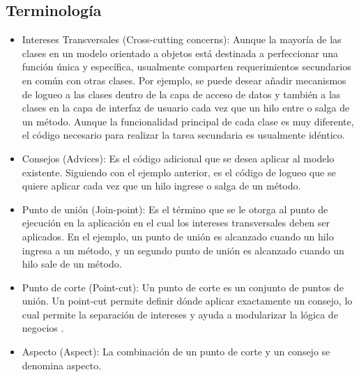 \subsection{Terminología}
\begin{itemize}
  \item Intereses Transversales (Cross-cutting concerns): Aunque la mayoría de
  las clases en un modelo orientado a objetos está destinada a perfeccionar una función única y
  específica, usualmente comparten requerimientos secundarios en común con otras
  clases. Por ejemplo, se puede desear añadir mecanismos de logueo a las clases
  dentro de la capa de acceso de datos y también a las clases en la capa de
  interfaz de usuario cada vez que un hilo entre o salga de un método. Aunque la
  funcionalidad principal de cada clase es muy diferente, el código necesario
  para realizar la tarea secundaria es usualmente
  idéntico.\cite{Introduction_To_Aspect}
  
  \item Consejos (Advices): Es el código adicional que se desea aplicar al
  modelo existente. Siguiendo con el ejemplo anterior, es el código de logueo
  que se quiere aplicar cada vez que un hilo ingrese o salga de un
  método.\cite{Introduction_To_Aspect}
  
  \item Punto de unión (Join-point): Es el término que se le otorga al punto
  de ejecución en la aplicación en el cual los intereses transversales deben ser
  aplicados. En el ejemplo, un punto de unión es alcanzado cuando un hilo
  ingresa a un método, y un segundo punto de unión es alcanzado cuando un hilo
  sale de un método.
  
  \item Punto de corte (Point-cut): Un punto de corte es un conjunto de puntos
  de unión. Un point-cut permite definir dónde aplicar exactamente un consejo,
  lo cual permite la separación de intereses y ayuda a modularizar la lógica de
  negocios \cite{Classification_Of_Pointcut_Language_Constructs}.
  
  \item Aspecto (Aspect): La combinación de un punto de corte y un consejo se
  denomina aspecto. \cite{Introduction_To_Aspect}
\end{itemize} 
